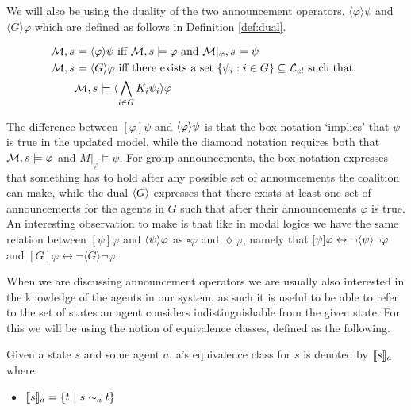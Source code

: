 We will also be using the duality of the two announcement operators, $\langle\varphi\rangle\psi$ and $\langle G\rangle\varphi$ which are defined as follows in Definition \ref{def:dual}.

\begin{definition} \hfill
	\label{def:dual}
	\begin{align*}
		\mathcal{M},s &\models \langle\varphi\rangle\psi\textrm{ iff }\mathcal{M},s \models \varphi\textrm{ and }\mathcal{M}|_\varphi,s \models \psi \\
		\mathcal{M},s &\models \langle G\rangle\varphi \textrm{ iff there exists a set }\{\psi_i:i\in G\} \subseteq \textrm{$\mathcal{L}_{el}$ such that: }\\
			   &\mathcal{M},s \models \langle\bigwedge_{i\in G}K_i\psi_i\rangle\varphi
	\end{align*}

\end{definition}

The difference between $[\varphi]\psi$ and $\langle\varphi\rangle\psi$ is that the box notation `implies' that $\psi$ is true in the updated model, while the diamond notation requires both that $\mathcal{M},s\models \varphi$ and $M|_\varphi \models \psi$. For group announcements, the box notation expresses that something has to hold after any possible set of announcements the coalition can make, while the dual $\langle G\rangle$ expresses that there exists at least one set of announcements for the agents in $G$ such that after their announcements $\varphi$ is true. An interesting observation to make is that like in modal logics we have the same relation between $[\psi]\varphi$ and $\langle\psi\rangle\varphi$ as $\square\varphi$ and $\lozenge\varphi$, namely that $[\psi]\varphi \leftrightarrow \neg\langle\psi\rangle\neg\varphi$ and $[G]\varphi \leftrightarrow \neg\langle G\rangle\neg\varphi$.

When we are discussing announcement operators we are usually also interested in the knowledge of the agents in our system, as such it is useful to be able to refer to the set of states an agent considers indistinguishable from the given state. For this we will be using the notion of equivalence classes, defined as the following.

\begin{definition}
	\label{def:eqclass}
	Given a state $s$ and some agent $a$, a's equivalence class for $s$ is denoted by $\llbracket s\rrbracket_a$ where
	\begin{itemize}
		\item[] $\llbracket s\rrbracket_a = \{t~|~s\sim_a t\}$
	\end{itemize}
\end{definition}


